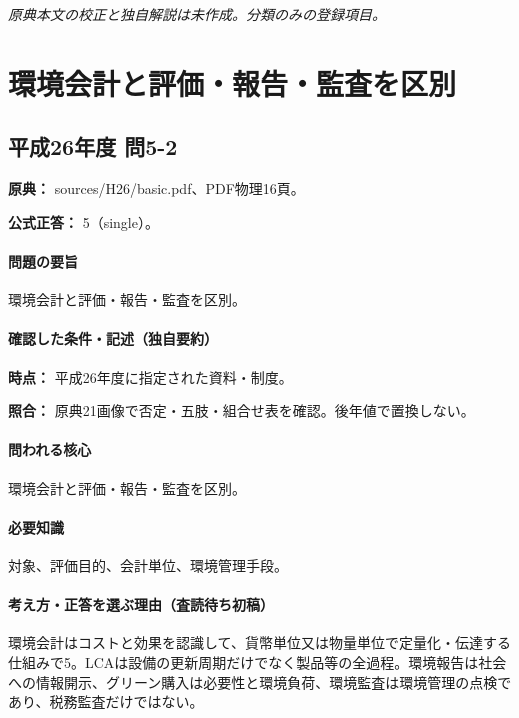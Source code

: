 \par\textit{原典本文の校正と独自解説は未作成。分類のみの登録項目。}

\section{環境会計と評価・報告・監査を区別}

\subsection{平成26年度 問5-2}
\label{q:h26-reg-basic-5-2}

\noindent\textbf{原典：} sources/H26/basic.pdf、PDF物理16頁。

\textbf{公式正答：} 5（single）。

\paragraph{問題の要旨} 環境会計と評価・報告・監査を区別。

\paragraph{確認した条件・記述（独自要約）}\mbox{}\par

\noindent\textbf{時点：} 平成26年度に指定された資料・制度。\par

\noindent\textbf{照合：} 原典21画像で否定・五肢・組合せ表を確認。後年値で置換しない。\par

\paragraph{問われる核心} 環境会計と評価・報告・監査を区別。

\paragraph{必要知識} 対象、評価目的、会計単位、環境管理手段。

\paragraph{考え方・正答を選ぶ理由（査読待ち初稿）} 環境会計はコストと効果を認識して、貨幣単位又は物量単位で定量化・伝達する仕組みで5。LCAは設備の更新周期だけでなく製品等の全過程。環境報告は社会への情報開示、グリーン購入は必要性と環境負荷、環境監査は環境管理の点検であり、税務監査だけではない。

